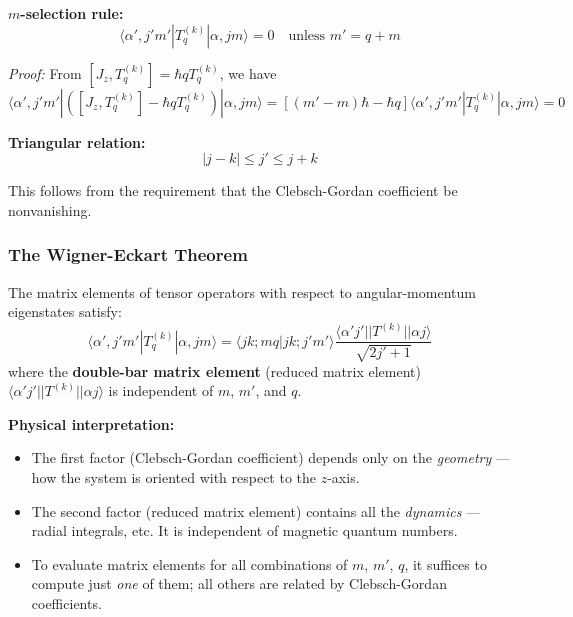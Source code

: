 \documentclass[11pt,a4paper]{article}
\begin{document}
\textbf{$m$-selection rule:}
\begin{equation}
\boxed{\langle\alpha', j'm'|T_q^{(k)}|\alpha, jm\rangle = 0 \quad \text{unless } m' = q + m}
\tag{3.471}
\end{equation}

\textit{Proof:} From $[J_z, T_q^{(k)}] = \hbar q T_q^{(k)}$, we have
\[
\langle\alpha', j'm'|\left([J_z, T_q^{(k)}] - \hbar q T_q^{(k)}\right)|\alpha, jm\rangle = [(m' - m)\hbar - \hbar q]\langle\alpha', j'm'|T_q^{(k)}|\alpha, jm\rangle = 0
\]

\textbf{Triangular relation:}
\begin{equation}
\boxed{|j - k| \leq j' \leq j + k}
\tag{3.475}
\end{equation}

This follows from the requirement that the Clebsch-Gordan coefficient be nonvanishing.

\subsubsection{The Wigner-Eckart Theorem}

\begin{tcolorbox}[colback=blue!5!white, colframe=blue!75!black, title=Wigner-Eckart Theorem]
The matrix elements of tensor operators with respect to angular-momentum eigenstates satisfy:
\begin{equation}
\boxed{\langle\alpha', j'm'|T_q^{(k)}|\alpha, jm\rangle = \langle jk; mq|jk; j'm'\rangle \frac{\langle\alpha' j'||T^{(k)}||\alpha j\rangle}{\sqrt{2j'+1}}}
\tag{3.474}
\end{equation}
where the \textbf{double-bar matrix element} (reduced matrix element) $\langle\alpha' j'||T^{(k)}||\alpha j\rangle$ is independent of $m$, $m'$, and $q$.
\end{tcolorbox}

\textbf{Physical interpretation:}
\begin{itemize}
\item The first factor (Clebsch-Gordan coefficient) depends only on the \textit{geometry} --- how the system is oriented with respect to the $z$-axis.
\item The second factor (reduced matrix element) contains all the \textit{dynamics} --- radial integrals, etc. It is independent of magnetic quantum numbers.
\item To evaluate matrix elements for all combinations of $m$, $m'$, $q$, it suffices to compute just \textit{one} of them; all others are related by Clebsch-Gordan coefficients.
\end{itemize}
\end{document}
